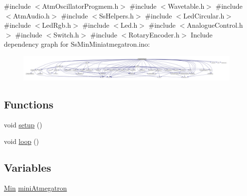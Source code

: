 {\ttfamily \#include $<$Atm\+Oscillator\+Progmem.\+h$>$}\newline
{\ttfamily \#include $<$Wavetable.\+h$>$}\newline
{\ttfamily \#include $<$Atm\+Audio.\+h$>$}\newline
{\ttfamily \#include $<$Ss\+Helpers.\+h$>$}\newline
{\ttfamily \#include $<$Led\+Circular.\+h$>$}\newline
{\ttfamily \#include $<$Led\+Rgb.\+h$>$}\newline
{\ttfamily \#include $<$Led.\+h$>$}\newline
{\ttfamily \#include $<$Analogue\+Control.\+h$>$}\newline
{\ttfamily \#include $<$Switch.\+h$>$}\newline
{\ttfamily \#include $<$Rotary\+Encoder.\+h$>$}\newline
Include dependency graph for Ss\+Min\+Miniatmegatron.\+ino\+:
\nopagebreak
\begin{figure}[H]
\begin{center}
\leavevmode
\includegraphics[width=350pt]{d2/d5b/_ss_min_miniatmegatron_8ino__incl}
\end{center}
\end{figure}
\subsection*{Functions}
\begin{DoxyCompactItemize}
\item 
void \hyperlink{_ss_min_miniatmegatron_8ino_a4fc01d736fe50cf5b977f755b675f11d}{setup} ()
\item 
void \hyperlink{_ss_min_miniatmegatron_8ino_afe461d27b9c48d5921c00d521181f12f}{loop} ()
\end{DoxyCompactItemize}
\subsection*{Variables}
\begin{DoxyCompactItemize}
\item 
\hyperlink{class_min}{Min} \hyperlink{_ss_min_miniatmegatron_8ino_a75f390a8ad79e74fbf5ebf8f798e92e0}{mini\+Atmegatron}
\end{DoxyCompactItemize}


